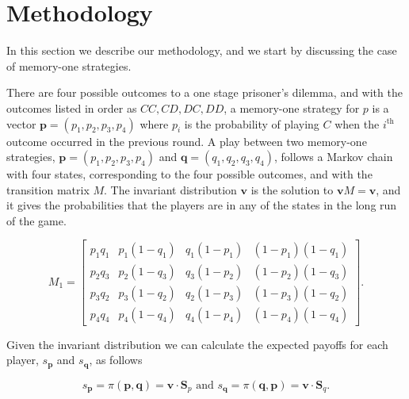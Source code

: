 \documentclass{article}
\theoremstyle{definition}
\begin{document}
\section{Methodology}\label{section:methodology}

In this section we describe our methodology, and we start by discussing
the case of memory-one strategies.

There are four possible outcomes to a one stage prisoner's dilemma, and with the
outcomes listed in order as \(CC, CD, DC, DD\), a memory-one strategy for \(p\)
is a vector \(\mathbf{p} = (p_1, p_2, p_3, p_4)\) where \(p_i\) is the
probability of playing \(C\) when the \(i^{\text{th}}\) outcome occurred in the
previous round. A play between two memory-one strategies, \(\mathbf{p} = (p_1,
p_2, p_3, p_4)\) and \(\mathbf{q} = (q_1, q_2, q_3, q_4)\), follows a Markov
chain with four states, corresponding to the four possible outcomes, and with
the transition matrix \(M\). The invariant distribution \(\mathbf{v}\) is the
solution to \(\mathbf{v} M = \mathbf{v}\), and it gives the probabilities that
the players are in any of the states in the long run of the game.

\begin{equation}
\displaystyle M_1 = \left[\begin{matrix}p_{1} q_{1} & p_{1} \left(1 - q_{1}\right) & q_{1} \left(1 - p_{1}\right) & \left(1 - p_{1}\right) \left(1 - q_{1}\right)\\
  p_{2} q_{3} & p_{2} \left(1 - q_{3}\right) & q_{3} \left(1 - p_{2}\right) & \left(1 - p_{2}\right) \left(1 - q_{3}\right)\\
  p_{3} q_{2} & p_{3} \left(1 - q_{2}\right) & q_{2} \left(1 - p_{3}\right) & \left(1 - p_{3}\right) \left(1 - q_{2}\right)\\
  p_{4} q_{4} & p_{4} \left(1 - q_{4}\right) & q_{4} \left(1 - p_{4}\right) & \left(1 - p_{4}\right) \left(1 - q_{4}\right)\end{matrix}\right].
\end{equation}

Given the invariant distribution we can calculate the expected payoffs for
each player, \(s_{\mathbf{p}}\) and \(s_{\mathbf{q}}\), as follows~\citep{Nowak:AMC:1989}

\begin{equation*}
  s_{\mathbf{p}} = \pi(\mathbf{p}, \mathbf{q}) = \mathbf{v} \cdot \mathbf{S}_{p} \text{ and } s_{\mathbf{q}} = \pi(\mathbf{q}, \mathbf{p}) = \mathbf{v} \cdot \mathbf{S}_{q}.
\end{equation*}
\end{document}
